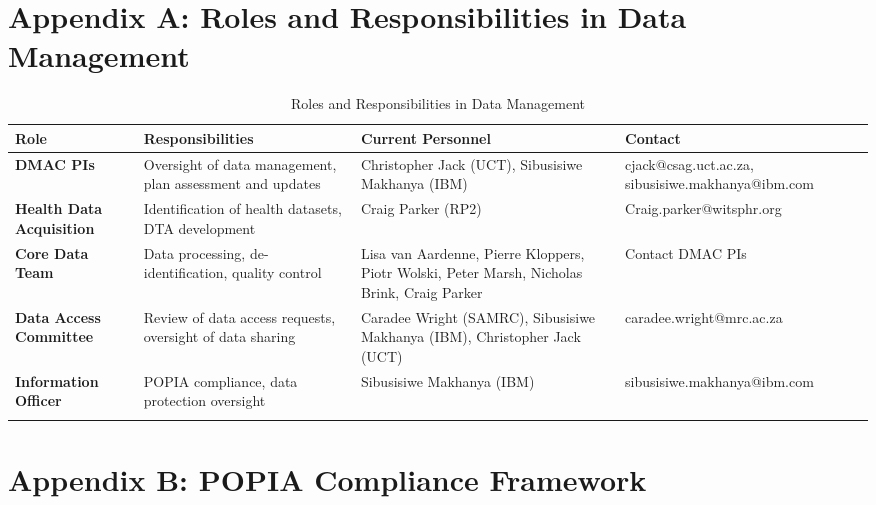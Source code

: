 \documentclass[12pt,a4paper,landscape]{article}
\begin{document}
\section*{Appendix A: Roles and Responsibilities in Data Management}

\begin{longtable}{p{3cm}p{6cm}p{5.5cm}p{5cm}}
\toprule
\textbf{Role} & \textbf{Responsibilities} & \textbf{Current Personnel} & \textbf{Contact} \\
\midrule
\endhead

\textbf{DMAC PIs} 
& Oversight of data management, plan assessment and updates 
& Christopher Jack (UCT), Sibusisiwe Makhanya (IBM) 
& cjack@csag.uct.ac.za, sibusisiwe.makhanya@ibm.com \\
\midrule

\textbf{Health Data Acquisition} 
& Identification of health datasets, DTA development 
& Craig Parker (RP2) 
& Craig.parker@witsphr.org \\
\midrule

\textbf{Core Data Team} 
& Data processing, de-identification, quality control 
& Lisa van Aardenne, Pierre Kloppers, Piotr Wolski, Peter Marsh, Nicholas Brink, Craig Parker 
& Contact DMAC PIs \\
\midrule

\textbf{Data Access Committee} 
& Review of data access requests, oversight of data sharing 
& Caradee Wright (SAMRC), Sibusisiwe Makhanya (IBM), Christopher Jack (UCT) 
& caradee.wright@mrc.ac.za \\
\midrule

\textbf{Information Officer} 
& POPIA compliance, data protection oversight 
& Sibusisiwe Makhanya (IBM) 
& sibusisiwe.makhanya@ibm.com \\
\bottomrule
\caption{Roles and Responsibilities in Data Management}
\end{longtable}
\clearpage

\section*{Appendix B: POPIA Compliance Framework}
\end{document}
